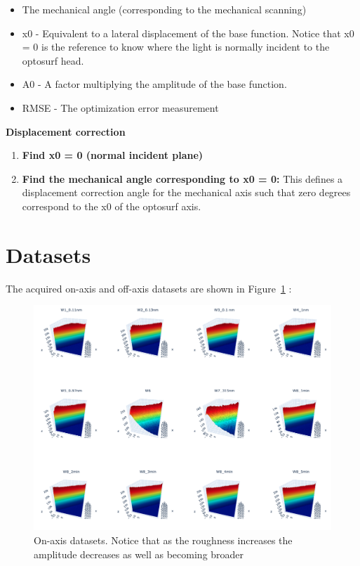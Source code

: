 \documentclass[
  letterpaper,
  DIV=11,
  numbers=noendperiod,
  oneside]{scrreprt}
\providecommand{\tightlist}{%
  \setlength{\itemsep}{0pt}\setlength{\parskip}{0pt}}\usepackage{longtable,booktabs,array}
\begin{document}
\begin{itemize}
\tightlist
\item
  The mechanical angle (corresponding to the mechanical scanning)
\item
  x0 - Equivalent to a lateral displacement of the base function. Notice
  that x0 = 0 is the reference to know where the light is normally
  incident to the optosurf head.
\item
  A0 - A factor multiplying the amplitude of the base function.
\item
  RMSE - The optimization error measurement
\end{itemize}

\textbf{Displacement correction}

\begin{enumerate}
\def\labelenumi{\arabic{enumi}.}
\setcounter{enumi}{6}
\item
  \textbf{Find x0 = 0 (normal incident plane)}
\item
  \textbf{Find the mechanical angle corresponding to x0 = 0:} This
  defines a displacement correction angle for the mechanical axis such
  that zero degrees correspond to the x0 of the optosurf axis.
\end{enumerate}

\hypertarget{datasets}{%
\section{Datasets}\label{datasets}}

The acquired on-axis and off-axis datasets are shown in
Figure~\ref{fig-4-2} :

\begin{figure}

{\centering \includegraphics{notebooks/figures/c/fig_4_2_datasets.png}

}

\caption{\label{fig-4-2}On-axis datasets. Notice that as the roughness
increases the amplitude decreases as well as becoming broader}

\end{figure}
\end{document}
